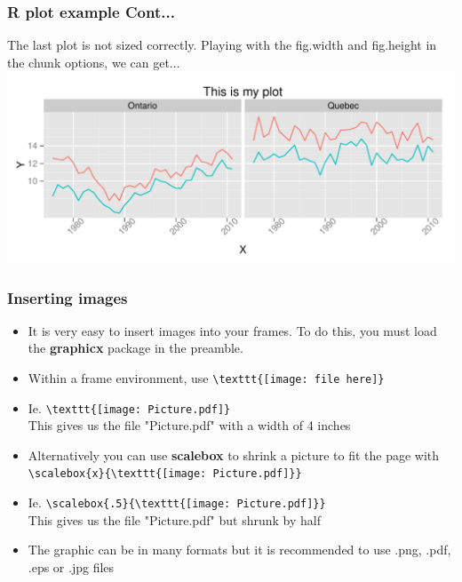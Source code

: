 \documentclass[nogin]{beamer}\usepackage[]{graphicx}\usepackage[]{color}
\makeatletter
\def\maxwidth{ %
  \ifdim\Gin@nat@width>\linewidth
    \linewidth
  \else
    \Gin@nat@width
  \fi
}
\newenvironment{knitrout}{}{} %
\makeatother
\begin{document}
\begin{frame}
\frametitle{R plot example Cont...}
The last plot is not sized correctly. Playing with the fig.width and fig.height in the chunk options, we can get...
\begin{knitrout}
\color{fgcolor}
\includegraphics[width=\maxwidth]{figure/unnamed-chunk-12} 

\end{knitrout}

\end{frame}

\begin{frame}[fragile]
\frametitle{Inserting images}
\scriptsize
\begin{itemize}
\item It is very easy to insert images into your frames. To do this, you must load the \textbf{graphicx} package in the preamble.
\item Within a frame environment, use \verb|\texttt{[image: file here]}|
\item Ie. \verb|\texttt{[image: Picture.pdf]}|\\
This gives us the file "Picture.pdf" with a width of 4 inches
\item Alternatively you can use \textbf{scalebox} to shrink a picture to fit the page with \verb|\scalebox{x}{\texttt{[image: Picture.pdf]}}|
\item Ie. \verb|\scalebox{.5}{\texttt{[image: Picture.pdf]}}|\\
This gives us the file "Picture.pdf" but shrunk by half
\item The graphic can be in many formats but it is recommended to use .png, .pdf, .eps or .jpg files
\end{itemize}
\end{frame}
\end{document}
